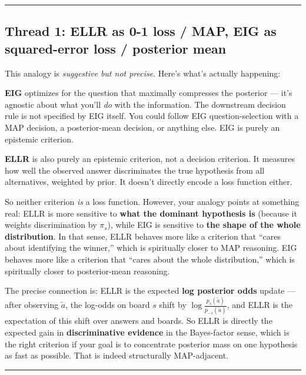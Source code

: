 \documentclass[
]{article}
\begin{document}
\begin{center}\rule{0.5\linewidth}{0.5pt}\end{center}

\subsection{Thread 1: ELLR as 0-1 loss / MAP, EIG as squared-error loss
/ posterior
mean}\label{thread-1-ellr-as-0-1-loss-map-eig-as-squared-error-loss-posterior-mean}

This analogy is \emph{suggestive but not precise}. Here's what's
actually happening:

\textbf{EIG} optimizes for the question that maximally compresses the
posterior --- it's agnostic about what you'll \emph{do} with the
information. The downstream decision rule is not specified by EIG
itself. You could follow EIG question-selection with a MAP decision, a
posterior-mean decision, or anything else. EIG is purely an epistemic
criterion.

\textbf{ELLR} is also purely an epistemic criterion, not a decision
criterion. It measures how well the observed answer discriminates the
true hypothesis from all alternatives, weighted by prior. It doesn't
directly encode a loss function either.

So neither criterion \emph{is} a loss function. However, your analogy
points at something real: ELLR is more sensitive to \textbf{what the
dominant hypothesis is} (because it weights discrimination by
\(\pi_s\)), while EIG is sensitive to \textbf{the shape of the whole
distribution}. In that sense, ELLR behaves more like a criterion that
``cares about identifying the winner,'' which is spiritually closer to
MAP reasoning. EIG behaves more like a criterion that ``cares about the
whole distribution,'' which is spiritually closer to posterior-mean
reasoning.

The precise connection is: ELLR is the expected \textbf{log posterior
odds} update --- after observing \(\tilde{a}\), the log-odds on board
\(s\) shift by \(\log \frac{p_s(\tilde{a})}{\bar{p}_{-s}(\tilde{a})}\),
and ELLR is the expectation of this shift over answers and boards. So
ELLR is directly the expected gain in \textbf{discriminative evidence}
in the Bayes-factor sense, which is the right criterion if your goal is
to concentrate posterior mass on one hypothesis as fast as possible.
That is indeed structurally MAP-adjacent.

\begin{center}\rule{0.5\linewidth}{0.5pt}\end{center}
\end{document}
